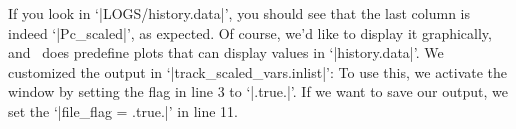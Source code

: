 If you look in `|LOGS/history.data|', you should see that the last column is indeed `|Pc_scaled|', as expected. Of course, we'd like to display it graphically, and \mesa\ does predefine plots that can display values in `|history.data|'. We customized the output in `|track_scaled_vars.inlist|':
To use this, we activate the window by setting the flag in line 3 to `|.true.|'. If we want to save our output, we set the `|file_flag = .true.|' in line 11.  

\UndefineShortVerb{\|}
